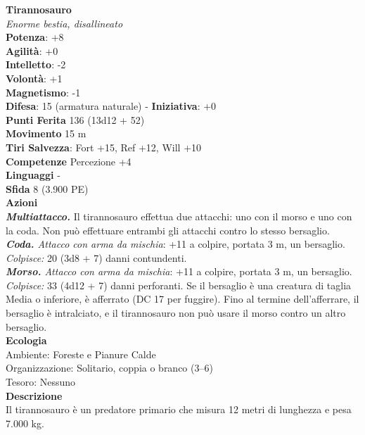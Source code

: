 \begin{multicols}{2}
\medskip\textbf{Tirannosauro}\\
\emph{Enorme bestia, disallineato}\\
\textbf{Potenza}: +8\\
\textbf{Agilità}: +0\\
\textbf{Intelletto}: -2\\
\textbf{Volontà}: +1\\
\textbf{Magnetismo}: -1\\
\textbf{Difesa}: 15 (armatura naturale) - \textbf{Iniziativa}: +0\\
\textbf{Punti Ferita} 136 (13d12 + 52)\\
\textbf{Movimento} 15 m\\
\textbf{Tiri Salvezza}: Fort +15, Ref +12, Will +10\\
\textbf{Competenze} Percezione +4\\
\textbf{Linguaggi} -\\
\textbf{Sfida} 8 (3.900 PE)\smallskip\\
\smallskip\textbf{Azioni}\\
\emph{\textbf{Multiattacco.}} Il tirannosauro effettua due attacchi: uno con il morso e uno con la coda. Non può effettuare entrambi gli attacchi contro lo stesso bersaglio. \\
\emph{\textbf{Coda.} Attacco con arma da mischia}: +11 a colpire, portata 3 m, un bersaglio.\\
\emph{Colpisce:} 20 (3d8 + 7) danni contundenti.\\
\emph{\textbf{Morso.} Attacco con arma da mischia}: +11 a colpire, portata 3 m, un bersaglio.\\
\emph{Colpisce:} 33 (4d12 + 7) danni perforanti. Se il bersaglio è una creatura di taglia Media o inferiore, è afferrato (DC 17 per fuggire). Fino al termine dell'afferrare, il bersaglio è intralciato, e il tirannosauro non può usare il morso contro un altro bersaglio.\\
\textbf{Ecologia}\\
Ambiente: Foreste e Pianure Calde\\
Organizzazione: Solitario, coppia o branco (3–6)\\
Tesoro: Nessuno\\
\textbf{Descrizione}\\
Il tirannosauro è un predatore primario che misura 12 metri di lunghezza e pesa 7.000 kg.\\


\end{multicols}
